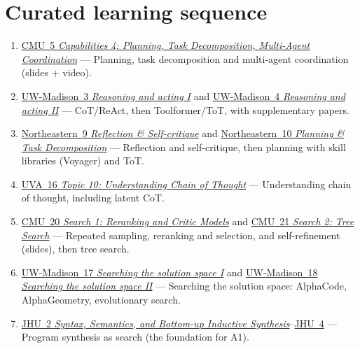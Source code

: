\documentclass[10pt,oneside]{report}
\begin{document}
\section{Curated learning sequence}
\begin{enumerate}
\item \hyperlink{lec-CMU-5}{CMU~5 \emph{Capabilities 4: Planning, Task Decomposition, Multi-Agent Coordination}} --- Planning, task decomposition and multi-agent coordination (slides + video).
\item \hyperlink{lec-UW-3}{UW-Madison~3 \emph{Reasoning and acting I}} and \hyperlink{lec-UW-4}{UW-Madison~4 \emph{Reasoning and acting II}} --- CoT/ReAct, then Toolformer/ToT, with supplementary papers.
\item \hyperlink{lec-NEU-9}{Northeastern~9 \emph{Reflection \& Self-critique}} and \hyperlink{lec-NEU-10}{Northeastern~10 \emph{Planning \& Task Decomposition}} --- Reflection and self-critique, then planning with skill libraries (Voyager) and ToT.
\item \hyperlink{lec-UVA-16}{UVA~16 \emph{Topic 10: Understanding Chain of Thought}} --- Understanding chain of thought, including latent CoT.
\item \hyperlink{lec-CMU-20}{CMU~20 \emph{Search 1: Reranking and Critic Models}} and \hyperlink{lec-CMU-21}{CMU~21 \emph{Search 2: Tree Search}} --- Repeated sampling, reranking and selection, and self-refinement (slides), then tree search.
\item \hyperlink{lec-UW-17}{UW-Madison~17 \emph{Searching the solution space I}} and \hyperlink{lec-UW-18}{UW-Madison~18 \emph{Searching the solution space II}} --- Searching the solution space: AlphaCode, AlphaGeometry, evolutionary search.
\item \hyperlink{lec-JHU-2}{JHU~2 \emph{Syntax, Semantics, and Bottom-up Inductive Synthesis}}--\hyperlink{lec-JHU-4}{JHU~4} --- Program synthesis as search (the foundation for A1).
\end{enumerate}
\end{document}
